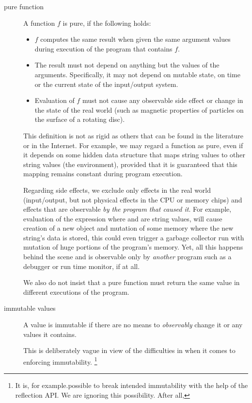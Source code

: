 \begin{description}
\item[pure function] A function $f$ is pure, if the following holds:
\begin{itemize}
\item $f$ computes the same result when given the same argument values during execution of the program that contains $f$.
\item The result must not depend on anything but the values of the arguments. Specifically, it may not depend on mutable state, on time or the current state of the input/output system.
\item Evaluation of $f$ must not cause any observable side effect or change in the state of the real world (such as magnetic properties of particles on the surface of a rotating disc).
\end{itemize}
This definition is not as rigid as others that can be found in the literature or in the Internet. For example, we may regard a function  as pure, even if it depends on some hidden data structure that maps string values to other string values (the environment), provided that it is guaranteed that this mapping remains constant during program execution. 

Regarding side effects, we exclude only effects in the real world (input/output, but not physical effects in the CPU or memory chips) and effects that are observable \emph{by the program that caused it}. For example, evaluation of the expression
where  and  are string values, will cause creation of a new \java{}  object and mutation of some memory where the new string's data is stored, this could even trigger a garbage collector run with mutation of huge portions of the program's memory. Yet, all this happens behind the scene and is observable only by \emph{another} program such as a debugger or run time monitor, if at all.

We also do not insist that a pure function must return the same value in different executions of the program. 

\item[immutable values] A value is immutable if there are no means to \emph{observably} change it or any values it contains.

This is deliberately vague in view of the difficulties in \java{} when it comes to enforcing immutability. \footnote{It is, for example.possible to break intended immutability with the help of  the reflection API. We are ignoring this possibility. After all, }


\end{description}
